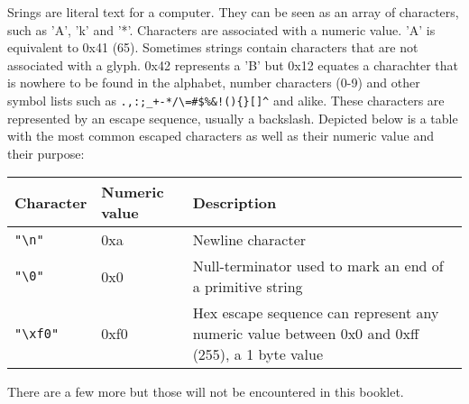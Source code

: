 Srings are literal text for a computer. They can be seen as an array of characters, such as 'A', 'k' and '*'. Characters are
associated with a numeric value. 'A' is equivalent to 0x41 (65). Sometimes strings contain characters that are not associated
with a glyph. 0x42 represents a 'B' but 0x12 equates a charachter that is nowhere to be found in the alphabet, number characters
(0-9) and other symbol lists such as \texttt{.,:;\_+-*/\textbackslash \tilde =\#\$\@\%\&!()\{\}[]\^} and alike. These characters are represented
by an escape sequence, usually a backslash. Depicted below is a table with the most common escaped characters as well as their numeric value and their purpose:

\begin{tabular}{ | l | l | l |}
Character & Numeric value & Description \\
  \hline
 \texttt{"\textbackslash n"} & 0xa & Newline character \\
 \texttt{"\textbackslash 0"} & 0x0 & Null-terminator used to mark an end of a primitive string \\
 \texttt{"\textbackslash xf0"} &  0xf0 & Hex escape sequence can represent any numeric value between 0x0 and 0xff (255), a 1 byte value \\
\end{tabular}
There are a few more but those will not be encountered in this booklet.
